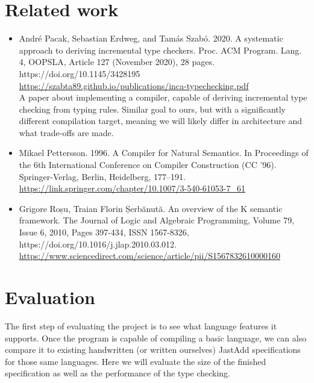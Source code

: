 \documentclass{article}
\begin{document}
\section{Related work}
\begin{itemize}
  \item
    André Pacak, Sebastian Erdweg, and Tamás Szabó. 2020. A systematic approach to deriving incremental type checkers. Proc. ACM Program. Lang. 4, OOPSLA, Article 127 (November 2020), 28 pages. https://doi.org/10.1145/3428195 \\
    \url{https://szabta89.github.io/publications/inca-typechecking.pdf} \\
    A paper about implementing a compiler, capable of deriving incremental type checking from typing rules.
    Similar goal to ours, but with a significantly different compilation target, meaning we will likely differ in architecture and what trade-offs are made.

  \item
    Mikael Pettersson. 1996. A Compiler for Natural Semantics. In Proceedings of the 6th International Conference on Compiler Construction (CC '96). Springer-Verlag, Berlin, Heidelberg, 177–191. \\
    \url{https://link.springer.com/chapter/10.1007/3-540-61053-7\_61} \\

  \item
    Grigore Roșu, Traian Florin Șerbănută. An overview of the K semantic framework.
The Journal of Logic and Algebraic Programming, Volume 79, Issue 6, 2010, Pages 397-434, ISSN 1567-8326, https://doi.org/10.1016/j.jlap.2010.03.012. \\
    \url{https://www.sciencedirect.com/science/article/pii/S1567832610000160} \\

\end{itemize}


\section{Evaluation}
The first step of evaluating the project is to see what language features it supports. %
Once the program is capable of compiling a basic language, we can also compare it to existing handwritten (or written ourselves) JastAdd specifications for those same languages.
Here we will evaluate the size of the finished specification as well as the performance of the type checking.
\end{document}
